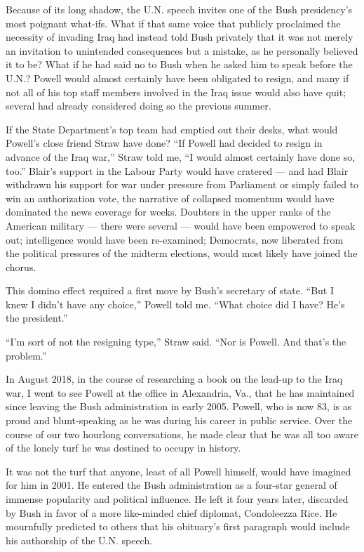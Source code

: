 Because of its long shadow, the U.N. speech invites one of the Bush
presidency's most poignant what-ifs. What if that same voice that
publicly proclaimed the necessity of invading Iraq had instead told Bush
privately that it was not merely an invitation to unintended
consequences but a mistake, as he personally believed it to be? What if
he had said no to Bush when he asked him to speak before the U.N.?
Powell would almost certainly have been obligated to resign, and many if
not all of his top staff members involved in the Iraq issue would also
have quit; several had already considered doing so the previous summer.

If the State Department's top team had emptied out their desks, what
would Powell's close friend Straw have done? ``If Powell had decided to
resign in advance of the Iraq war,'' Straw told me, ``I would almost
certainly have done so, too.'' Blair's support in the Labour Party would
have cratered --- and had Blair withdrawn his support for war under
pressure from Parliament or simply failed to win an authorization vote,
the narrative of collapsed momentum would have dominated the news
coverage for weeks. Doubters in the upper ranks of the American military
--- there were several --- would have been empowered to speak out;
intelligence would have been re-examined; Democrats, now liberated from
the political pressures of the midterm elections, would most likely have
joined the chorus.

This domino effect required a first move by Bush's secretary of state.
``But I knew I didn't have any choice,'' Powell told me. ``What choice
did I have? He's the president.''

``I'm sort of not the resigning type,'' Straw said. ``Nor is Powell. And
that's the problem.''

In August 2018, in the course of researching a book on the lead-up to
the Iraq war, I went to see Powell at the office in Alexandria, Va.,
that he has maintained since leaving the Bush administration in early
2005. Powell, who is now 83, is as proud and blunt-speaking as he was
during his career in public service. Over the course of our two hourlong
conversations, he made clear that he was all too aware of the lonely
turf he was destined to occupy in history.

It was not the turf that anyone, least of all Powell himself, would have
imagined for him in 2001. He entered the Bush administration as a
four-star general of immense popularity and political influence. He left
it four years later, discarded by Bush in favor of a more like-minded
chief diplomat, Condoleezza Rice. He mournfully predicted to others that
his obituary's first paragraph would include his authorship of the U.N.
speech.

